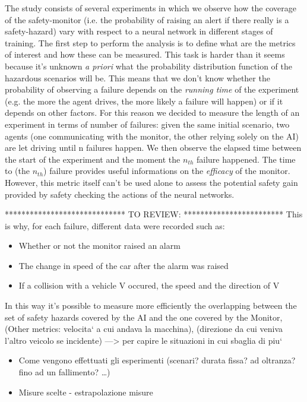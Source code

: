 The study consists of several experiments in which we observe how the coverage of the safety-monitor (i.e. the probability of raising an alert if there really is a safety-hazard) vary with respect to a neural network in different stages of training.\newline
The first step to perform the analysis is to define what are the metrics of interest and how these can be measured. This task is harder than it seems because it's unknown \textsl{a priori} what the probability distribution function of the hazardous scenarios will be. This means that we don't know whether the probability of observing a failure depends on the \textsl{running time} of the experiment (e.g. the more the agent drives, the more likely a failure will happen) or if it depends on other factors.\newline
For this reason we decided to measure the length of an experiment in terms of number of failures: given the same initial scenario, two agents (one communicating with the monitor, the other relying solely on the AI) are let driving until n failures happen. We then observe the elapsed time between the start of the experiment and the moment the $n_{th}$ failure happened.\newline
The time to (the $n_{th}$) failure provides useful informations on the \textsl{efficacy} of the monitor. However, this metric itself can't be used alone to assess the potential safety gain provided by safety checking the actions of the neural networks.\newline

*****************************\newline 
TO REVIEW: 
\newline *************************\newline
This is why, for each failure, different data were recorded such as:
\begin{itemize}
	\item Whether or not the monitor raised an alarm
	\item The change in speed of the car after the alarm was raised
	\item If a collision with a vehicle V occured, the speed and the direction of V
\end{itemize}

In this way it's possible to measure more efficiently the overlapping between the set of safety hazards covered by the AI and the one covered by the Monitor,
(Other metrics: velocita` a cui andava la macchina), (direzione da cui veniva l'altro veicolo se incidente)
---> per capire le situazioni in cui sbaglia di piu`

	\begin{itemize}
		
		\item Come vengono effettuati gli esperimenti (scenari? durata fissa? ad oltranza? fino ad un fallimento? \dots)
		\item Misure scelte - estrapolazione misure
		
	\end{itemize}

